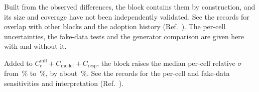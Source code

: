 Built from the observed differences, the block contains them by construction, and its size and coverage have not been independently validated. See the records for overlap with other blocks and the adoption history (Ref.~\cite{NoteRecords2026}). The per-cell uncertainties, the fake-data tests and the generator comparison are given here with and without it.

Added to $C_e^{\mathrm{infl}}+C_{\mathrm{model}}+C_{\mathrm{resp}}$, the block raises the median per-cell relative $\sigma$ from \,\% to \,\%, by about \,\%. See the records for the per-cell and fake-data sensitivities and interpretation (Ref.~\cite{NoteRecords2026}).
